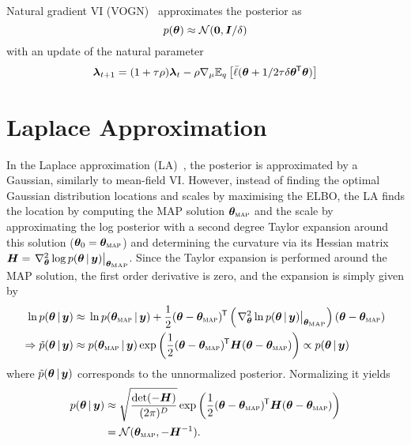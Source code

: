 Natural gradient VI (VOGN)~\cite{osawa2019practical} approximates the posterior as
%
\begin{equation*}
    p(\bm \theta) \approx \mathcal{N}(\bm 0, \bm I / \delta)
\end{equation*}
%
with an update of the natural parameter
\begin{equation*}
    \bm \lambda_{t+1} = (1 + \tau \rho) \bm \lambda_t - \rho \nabla_\mu \mathbb{E}_{q}\left[\bar{\ell}(\bm \theta + 1 / 2 \tau \delta \bm\theta^{\mkern-1.5mu\mathsf{T}} \bm\theta)\right]
\end{equation*}

\section{Laplace Approximation}

In the Laplace approximation (LA)~\cite{daxberger2021laplace}, the posterior is approximated by a Gaussian, similarly to mean-field VI.
However, instead of finding the optimal Gaussian distribution locations and scales by maximising the ELBO, the LA finds the location by computing the MAP solution \(\bm \theta_{\textsc{map}}\) and the scale by approximating the log posterior with a second degree Taylor expansion around this solution (\(\bm \theta_0 = \bm \theta_{\textsc{map}}\)) and determining the curvature via its Hessian matrix \(\bm H = \left.\nabla^2_{\bm \theta} \log p(\bm \theta \, | \, \bm y) \right|_{\bm \theta_\mathrm{MAP}}\).
Since the Taylor expansion is performed around the MAP solution, the first order derivative is zero, and the expansion is simply given by
\begin{align*}
    \ln p(\bm \theta \given \bm y)
    \approx{} & \ln p(\bm \theta_{\textsc{map}} \given \bm y) + \frac{1}{2} (\bm \theta - \bm \theta_{\textsc{map}})\T \left( \left.\nabla^2_{\bm \theta} \ln p(\bm \theta \given \bm y) \right|_{\bm \theta_\mathrm{MAP}} \right) (\bm \theta - \bm \theta_{\textsc{map}}) %
    \\ \Rightarrow \tilde{p}(\bm \theta \given \bm y) \approx{}& p(\bm \theta_{\textsc{map}} \given \bm y) \exp\left(\frac{1}{2} (\bm \theta - \bm \theta_{\textsc{map}})\T \bm H (\bm \theta - \bm \theta_{\textsc{map}})\right) \propto p(\bm \theta \given \bm y) \nonumber
\end{align*}
where \(\tilde{p}(\bm \theta \, | \, \bm y)\) corresponds to the unnormalized posterior.
Normalizing it yields
\begin{align*}
    p(\bm\theta \given \bm y) \approx{} & \sqrt{\frac{\det (- \bm H)}{(2 \pi)^D}} \exp\left(\frac{1}{2} (\bm \theta - \bm \theta_{\textsc{map}})\T \bm H (\bm \theta - \bm \theta_{\textsc{map}})\right) \nonumber
    \\={}& \normal(\bm \theta_{\textsc{map}}, - \bm H^{-1}).%
\end{align*}

